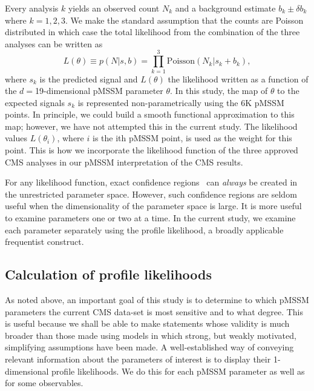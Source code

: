 Every analysis $k$ yields an observed count $N_k$ and a background estimate
$b_k \pm \delta b_k$ where $k=1,2,3$.  We make the standard assumption that the
counts are Poisson distributed in which case the total likelihood from the combination of the three analyses can be written as
\begin{equation}
L(\theta) \equiv p(N|s,b) = \prod_{k=1}^3 \mbox{Poisson}(N_k | s_k + b_k),
\end{equation}
where $s_k$ is the predicted signal and $L(\theta)$ the likelihood
written as a function of the  $d = $19-dimensional pMSSM parameter $\theta$. 
In this study, the
 map of $\theta$ to the expected signals $s_k$ is represented non-parametrically
 using the 6K pMSSM points. In principle, we could build a smooth functional approximation to
 this map; however, we have not attempted this in the current study. The likelihood 
 values $L(\theta_i)$,
 where $i$ is the ith pMSSM point, is used as the weight for this point. This is how we 
 incorporate the likelihood function of the three approved CMS analyses in our
 pMSSM interpretation
 of the CMS results. 
 
 For any likelihood function, exact confidence regions~\cite{James}  can \emph{always} 
 be created in
 the unrestricted parameter space. However, such
 confidence regions are seldom useful when the dimensionality of the 
 parameter space is large. It is 
 more useful to examine parameters one or two at a time. In the current study,
 we examine each parameter separately using the profile likelihood, a broadly applicable frequentist
 construct.

\subsection{Calculation of profile likelihoods}
As noted above, an important goal of this study is to determine to which pMSSM parameters the current  CMS data-set is most sensitive and to what degree. This is useful because we shall
be able to make statements whose validity is much broader than those made using
models in which strong, but weakly motivated, simplifying assumptions have been made.  A well-established way of conveying relevant information about the parameters of interest
 is to display their 1-dimensional profile likelihoods. We do this for each pMSSM parameter
as well as for some observables.

